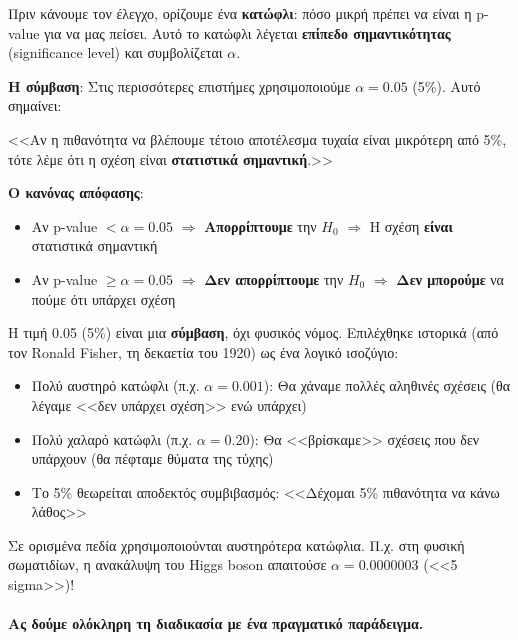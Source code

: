 \documentclass[12pt,a4paper]{article}
\begin{document}
\begin{theorybox}
Πριν κάνουμε τον έλεγχο, ορίζουμε ένα \textbf{κατώφλι}: πόσο μικρή πρέπει να είναι η p-value για να μας πείσει. Αυτό το κατώφλι λέγεται \textbf{επίπεδο σημαντικότητας} (significance level) και συμβολίζεται $\alpha$.

\textbf{Η σύμβαση}: Στις περισσότερες επιστήμες χρησιμοποιούμε $\alpha = 0.05$ (5\%). Αυτό σημαίνει:

<<Αν η πιθανότητα να βλέπουμε τέτοιο αποτέλεσμα τυχαία είναι μικρότερη από 5\%, τότε λέμε ότι η σχέση είναι \textbf{στατιστικά σημαντική}.>>

\textbf{Ο κανόνας απόφασης}:
\begin{itemize}
    \item Αν p-value $< \alpha = 0.05$ $\Rightarrow$ \textbf{Απορρίπτουμε} την $H_0$ $\Rightarrow$ Η σχέση \textbf{είναι} στατιστικά σημαντική
    \item Αν p-value $\geq \alpha = 0.05$ $\Rightarrow$ \textbf{Δεν απορρίπτουμε} την $H_0$ $\Rightarrow$ \textbf{Δεν μπορούμε} να πούμε ότι υπάρχει σχέση
\end{itemize}
\end{theorybox}

\begin{examplebox}[title={Γιατί ακριβώς $\alpha = 0.05$ και όχι κάτι άλλο;}]
Η τιμή 0.05 (5\%) είναι μια \textbf{σύμβαση}, όχι φυσικός νόμος. Επιλέχθηκε ιστορικά (από τον Ronald Fisher, τη δεκαετία του 1920) ως ένα λογικό ισοζύγιο:

\begin{itemize}
    \item Πολύ αυστηρό κατώφλι (π.χ. $\alpha = 0.001$): Θα χάναμε πολλές αληθινές σχέσεις (θα λέγαμε <<δεν υπάρχει σχέση>> ενώ υπάρχει)
    \item Πολύ χαλαρό κατώφλι (π.χ. $\alpha = 0.20$): Θα <<βρίσκαμε>> σχέσεις που δεν υπάρχουν (θα πέφταμε θύματα της τύχης)
    \item Το 5\% θεωρείται αποδεκτός συμβιβασμός: <<Δέχομαι 5\% πιθανότητα να κάνω λάθος>>
\end{itemize}

Σε ορισμένα πεδία χρησιμοποιούνται αυστηρότερα κατώφλια. Π.χ. στη φυσική σωματιδίων, η ανακάλυψη του Higgs boson απαιτούσε $\alpha = 0.0000003$ (<<5 sigma>>)!
\end{examplebox}

\paragraph{Ας δούμε ολόκληρη τη διαδικασία με ένα πραγματικό παράδειγμα.}
\end{document}
